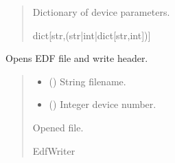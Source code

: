 \documentclass[letterpaper,10pt,english]{sphinxmanual}
\begin{document}
\begin{fulllineitems}
\begin{fulllineitems}
\begin{quote}
\begin{description}
\sphinxAtStartPar
Dictionary of device parameters.

\sphinxAtStartPar
dict{[}str,(str|int|dict{[}str,int{]}){]}

\end{description}\end{quote}

\end{fulllineitems}


\begin{fulllineitems}
\label{\detokenize{Setup_8206HR:Setup_8206HR.Setup_8206HR._OpenSaveFile_EDF}}
\pysigstartsignatures
{}
\pysigstopsignatures
\sphinxAtStartPar
Opens EDF file and write header.
\begin{quote}\begin{description}
\begin{itemize}
\item {} 
\sphinxAtStartPar
{} () \textendash{} String filename.

\item {} 
\sphinxAtStartPar
{} () \textendash{} Integer device number.

\end{itemize}

\sphinxAtStartPar
Opened file.

\sphinxAtStartPar
EdfWriter

\end{description}\end{quote}

\end{fulllineitems}



\end{fulllineitems}
\end{document}
